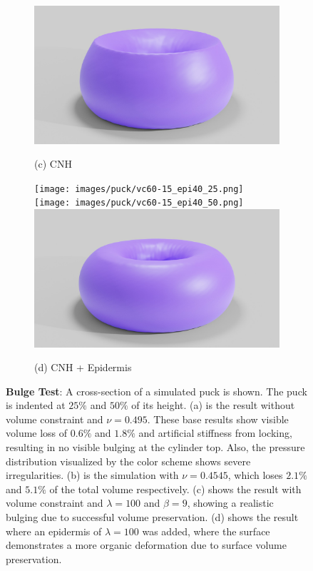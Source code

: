 \begin{figure}
\begin{subfigure}{.24\linewidth}
		{\includegraphics[width=1.4\textwidth]{images/puck/vc_render.jpg}}
		\caption*{(c) CNH}
		\label{sfig:puck-vc}
	\end{subfigure}%
	\begin{subfigure}{.24\linewidth}
		\centering
		\texttt{[image: images/puck/vc60-15\_epi40\_25.png]}
		\texttt{[image: images/puck/vc60-15\_epi40\_50.png]}
		{\includegraphics[width=1.4\textwidth]{images/puck/vc_epi_render.jpg}}
		\caption*{(d) CNH + Epidermis}
		\label{sfig:puck-vc-epi}
	\end{subfigure}%
	\caption{\textbf{Bulge Test}: A cross-section of a simulated puck is shown. The puck is indented at $25\%$ and $50\%$ of its height. (a) is the result without volume constraint and $\nu = 0.495$. These base results show visible volume loss of $0.6\%$ and $1.8\%$ and artificial stiffness from locking, resulting in no visible bulging at the cylinder top. Also, the pressure distribution visualized by the color scheme shows severe irregularities. (b) is the simulation with $\nu = 0.4545$, which loses $2.1\%$ and $5.1\%$ of the total volume respectively. (c) shows the result with volume constraint and $\lambda = 100$ and $\beta = 9$, showing a realistic bulging due to successful volume preservation. (d) shows the result where an epidermis of $\lambda = 100$ was added, where the surface demonstrates a more organic deformation due to surface volume preservation. }
	\label{fig:pucks}
\end{figure} 

